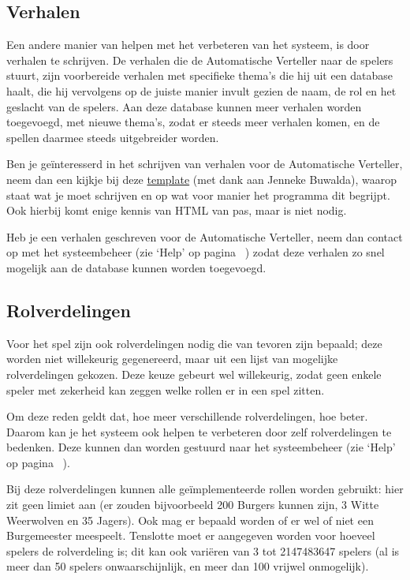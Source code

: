 \documentclass[12pt]{article}
\begin{document}
  \subsection{Verhalen} \label{subsec:verhalen}
  
  Een andere manier van helpen met het verbeteren van het systeem, is door verhalen te schrijven. De verhalen die de Automatische Verteller naar de spelers stuurt, zijn voorbereide verhalen met specifieke thema's die hij uit een database haalt, die hij vervolgens op de juiste manier invult gezien de naam, de rol en het geslacht van de spelers. Aan deze database kunnen meer verhalen worden toegevoegd, met nieuwe thema's, zodat er steeds meer verhalen komen, en de spellen daarmee steeds uitgebreider worden.
  
  Ben je ge\"interesserd in het schrijven van verhalen voor de Automatische Verteller, neem dan een kijkje bij deze \href{http://placeholder-voor-jennekes-template}{template} (met dank aan Jenneke Buwalda), waarop staat wat je moet schrijven en op wat voor manier het programma dit begrijpt. Ook hierbij komt enige kennis van HTML van pas, maar is niet nodig.
  
  Heb je een verhalen geschreven voor de Automatische Verteller, neem dan contact op met het systeembeheer (zie `Help' op pagina~\pageref{subsec:help} ) zodat deze verhalen zo snel mogelijk aan de database kunnen worden toegevoegd.

  \subsection{Rolverdelingen} \label{subsec:rolverdelingen}

  Voor het spel zijn ook rolverdelingen nodig die van tevoren zijn bepaald; deze worden niet willekeurig gegenereerd, maar uit een lijst van mogelijke rolverdelingen gekozen. Deze keuze gebeurt wel willekeurig, zodat geen enkele speler met zekerheid kan zeggen welke rollen er in een spel zitten.

  Om deze reden geldt dat, hoe meer verschillende rolverdelingen, hoe beter. Daarom kan je het systeem ook helpen te verbeteren door zelf rolverdelingen te bedenken. Deze kunnen dan worden gestuurd naar het systeembeheer (zie `Help' op pagina~\pageref{subsec:help} ).

  Bij deze rolverdelingen kunnen alle ge\"implementeerde rollen worden gebruikt: hier zit geen limiet aan (er zouden bijvoorbeeld 200 Burgers kunnen zijn, 3 Witte Weerwolven en 35 Jagers). Ook mag er bepaald worden of er wel of niet een Burgemeester meespeelt. Tenslotte moet er aangegeven worden voor hoeveel spelers de rolverdeling is; dit kan ook vari\"eren van 3 tot 2147483647 spelers (al is meer dan 50 spelers onwaarschijnlijk, en meer dan 100 vrijwel onmogelijk).
  
\end{document}

